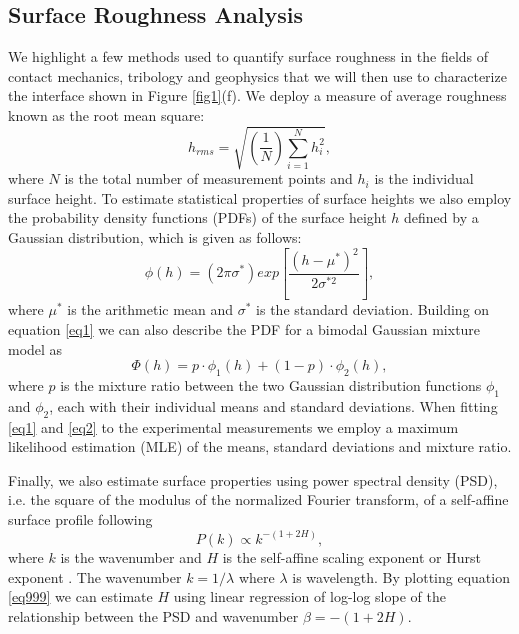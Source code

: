 \documentclass[preprint,1p, 10pt,authoryear]{elsarticle}
\begin{document}
\subsection{Surface Roughness Analysis}
\label{SRA}
We highlight a few methods used to quantify surface roughness in the fields of contact mechanics, tribology and geophysics that we will then use to characterize the interface shown in Figure \ref{fig1}(f). We deploy a measure of average roughness known as the root mean square:
\begin{equation}
h_{rms} = \sqrt{\left(\frac{1}{N} \right) \sum^{N}_{i=1} h_{i}^{2}} ,
\label{eq99}
\end{equation}
\noindent where $N$ is the total number of measurement points and $h_{i}$ is the individual surface height. To estimate statistical properties of surface heights we also employ the probability density functions (PDFs) of the surface height $h$ defined by a Gaussian distribution, which is given as follows:
\begin{equation}
\phi(h) = \left( 2\pi \sigma^{*} \right) exp\left[ \frac{\left(h - \mu^{*}\right)^{2}} { 2\sigma^{*2}}  \right],
\label{eq1}
\end{equation} 
\noindent where $\mu^{*}$ is the arithmetic mean and $\sigma^{*}$ is the standard deviation. Building on equation \eqref{eq1} we can also describe the PDF for a bimodal Gaussian mixture model as 
\begin{equation}
\Phi(h) = p\cdot \phi_{1}(h)+\left(1-p\right)\cdot \phi_{2}(h),
\label{eq2}
\end{equation}
\noindent where $p$ is the mixture ratio between the two Gaussian distribution functions $\phi_{1}$ and $\phi_{2}$, each with their individual means and standard deviations. When fitting \eqref{eq1} and \eqref{eq2} to the experimental measurements we employ a maximum likelihood estimation (MLE) of the means, standard deviations and mixture ratio. 

Finally, we also estimate surface properties using power spectral density (PSD), i.e.  the square of the modulus of the normalized Fourier transform, of a self-affine surface profile following 
\begin{equation}
P(k) \propto k^{-(1+2H)},
\label{eq999}
\end{equation}
\noindent where $k$ is the wavenumber and $H$ is the self-affine scaling exponent or Hurst exponent \citep{Power1991,Schmittbuhl1995, Candela2009}. The wavenumber $k = 1/\lambda$ where $\lambda$ is wavelength. By plotting equation \eqref{eq999} we can estimate $H$ using linear regression of log-log slope of the relationship between the PSD and wavenumber $\beta =-(1+2H)$.  
\end{document}
